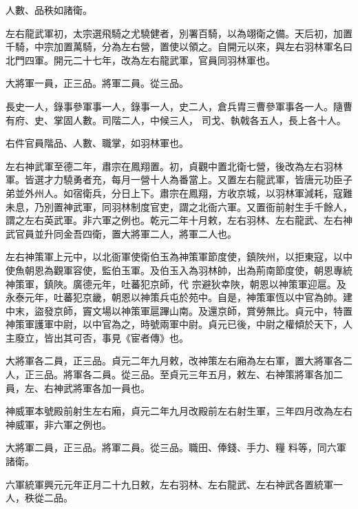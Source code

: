 \begin{pinyinscope}
 人數、品秩如諸衛。



 左右龍武軍初，太宗選飛騎之尤驍健者，別署百騎，以為翊衛之備。天后初，加置千騎，中宗加置萬騎，分為左右營，置使以領之。自開元以來，與左右羽林軍名曰北門四軍。開元二十七年，改為左右龍武軍，官員同羽林軍也。



 大將軍一員，正三品。將軍二員。從三品。



 長史一人，錄事參軍事一人，錄事一人，史二人，倉兵胄三曹參軍事各一人。隨曹有府、史、掌固人數。司階二人，中候三人，
 司戈、執戟各五人，長上各十人。



 右件官員階品、人數、職掌，如羽林軍也。



 左右神武軍至德二年，肅宗在鳳翔置。初，貞觀中置北衛七營，後改為左右羽林軍。皆選才力驍勇者充，每月一營十人為番當上。又置左右龍武軍，皆唐元功臣子弟並外州人。如宿衛兵，分日上下。肅宗在鳳翔，方收京城，以羽林軍減耗，寇難未息，乃別置神武軍，同羽林制度官吏，謂之北衙六軍。又置衙前射生手千餘人，謂之左右英武軍。非六軍之例也。乾元二年十月敕，左右羽林、左右龍武、左右神武官員並升同金吾四衛，置大將軍二人，將軍二人也。



 左右神策軍上元中，以北衙軍使衛伯玉為神策軍節度使，鎮陜州，以拒東寇，以中使魚朝恩為觀軍容使，監伯玉軍。及伯玉入為羽林帥，出為荊南節度使，朝恩專統神策軍，鎮陜。廣德元年，吐蕃犯京師，代
 宗避狄幸陜，朝恩以神策軍迎扈。及永泰元年，吐蕃犯京畿，朝恩以神策兵屯於苑中。自是，神策軍恆以中官為帥。建中末，盜發京師，竇文場以神策軍扈蹕山南。及還京師，賞勞無比。貞元中，特置神策軍護軍中尉，以中官為之，時號兩軍中尉。貞元已後，中尉之權傾於天下，人主廢立，皆出其可否，事見《宦者傳》也。



 大將軍各二員，正三品。貞元二年九月敕，改神策左右廂為左右軍，置大將軍各二人，正三品。將軍各二員。從三品。至貞元三年五月，敕左、右神策將軍各加二員，左、右神武將軍各加一員也。



 神威軍本號殿前射生左右廂，貞元二年九月改殿前左右射生軍，三年四月改為左右神威軍，非六軍之例也。



 大將軍二員，正三品。將軍二員。從三品。職田、俸錢、手力、糧
 料等，同六軍諸衛。



 六軍統軍興元元年正月二十九日敕，左右羽林、左右龍武、左右神武各置統軍一人，秩從二品。




\end{pinyinscope}
